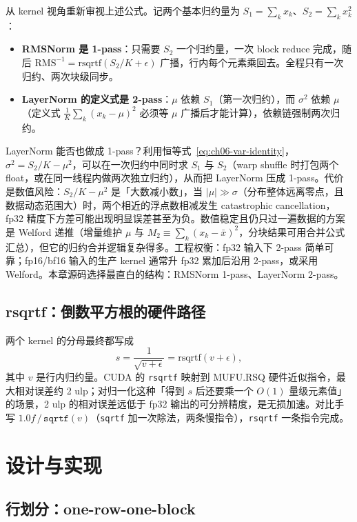 从 kernel 视角重新审视上述公式。记两个基本归约量为 $S_1 = \sum_k x_k$、$S_2 = \sum_k x_k^2$：
\begin{itemize}
  \item \textbf{RMSNorm 是 1-pass}：只需要 $S_2$ 一个归约量，一次 block reduce 完成，随后 $\mathrm{RMS}^{-1} = \mathrm{rsqrtf}(S_2/K + \epsilon)$ 广播，行内每个元素乘回去。全程只有一次归约、两次块级同步。
  \item \textbf{LayerNorm 的定义式是 2-pass}：$\mu$ 依赖 $S_1$（第一次归约），而 $\sigma^2$ 依赖 $\mu$（定义式 $\frac{1}{K}\sum_k (x_k-\mu)^2$ 必须等 $\mu$ 广播后才能计算），依赖链强制两次归约。
\end{itemize}

LayerNorm 能否也做成 1-pass？利用恒等式~\eqref{eq:ch06-var-identity}，$\sigma^2 = S_2/K - \mu^2$，可以在一次归约中同时求 $S_1$ 与 $S_2$（warp shuffle 时打包两个 float，或在同一线程内做两次独立归约），从而把 LayerNorm 压成 1-pass。代价是数值风险：$S_2/K - \mu^2$ 是「大数减小数」，当 $|\mu| \gg \sigma$（分布整体远离零点，且数据动态范围大）时，两个相近的浮点数相减发生 catastrophic cancellation，fp32 精度下方差可能出现明显误差甚至为负。数值稳定且仍只过一遍数据的方案是 Welford 递推（增量维护 $\mu$ 与 $M_2 \equiv \sum_k (x_k-\bar{x})^2$，分块结果可用合并公式汇总），但它的归约合并逻辑复杂得多。工程权衡：fp32 输入下 2-pass 简单可靠；fp16/bf16 输入的生产 kernel 通常升 fp32 累加后沿用 2-pass，或采用 Welford。本章源码选择最直白的结构：RMSNorm 1-pass、LayerNorm 2-pass。

\subsection{rsqrtf：倒数平方根的硬件路径}

两个 kernel 的分母最终都写成
\begin{equation}
  s = \frac{1}{\sqrt{v + \epsilon}} = \mathrm{rsqrtf}(v + \epsilon),
\end{equation}
其中 $v$ 是行内归约量。CUDA 的 \texttt{rsqrtf} 映射到 MUFU.RSQ 硬件近似指令，最大相对误差约 2 ulp；对归一化这种「得到 $s$ 后还要乘一个 $O(1)$ 量级元素值」的场景，2 ulp 的相对误差远低于 fp32 输出的可分辨精度，是无损加速。对比手写 $1.0f\,/\,\texttt{sqrtf}(v)$（\texttt{sqrtf} 加一次除法，两条慢指令），\texttt{rsqrtf} 一条指令完成。

\section{设计与实现}

\subsection{行划分：one-row-one-block}

